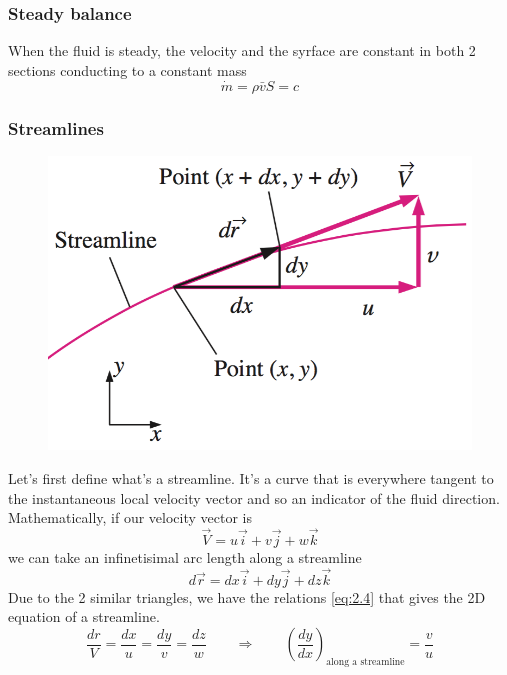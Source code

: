 		\subsubsection{Steady balance}
			When the fluid is steady, the velocity and the syrface are constant in both 2 sections conducting to a constant mass
			\begin{equation}
				\dot{m} = \rho \bar{v}S = c
			\end{equation}

		\subsubsection{Streamlines}
			\begin{figure}
			\vspace{-5mm}
			\includegraphics[scale=0.35]{ch2/2}
			\end{figure}
			Let's first define what's a streamline. It's a curve that is everywhere tangent to the instantaneous local velocity vector and so an indicator of the fluid direction. 
			Mathematically, if our velocity vector is 
			\begin{equation}
				\vec{V} = u\vec{i}+v\vec{j}+w\vec{k}
			\end{equation}
			we can take an infinetisimal arc length along a streamline 
			\begin{equation}
				d\vec{r} = dx\vec{i}+dy\vec{j}+dz\vec{k}
			\end{equation}
			Due to the 2 similar triangles, we have the relations \autoref{eq:2.4} that gives the 2D equation of a streamline.
			\begin{equation}
				\frac{dr}{V} = \frac{dx}{u} = \frac{dy}{v} = \frac{dz}{w} \qquad
				 \Rightarrow \qquad
				 \left(\frac{dy}{dx}\right)_{\mbox{along a streamline}} = \frac{v}{u}
				\label{eq:2.4}
			\end{equation}
			
